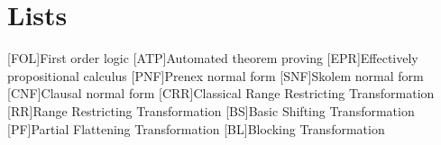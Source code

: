 \appendix
\renewcommand{\appendixtocname}{Appendix}
\renewcommand{\appendixpagename}{\appendixtocname}
\addappheadtotoc
{}
\appendixpage

\chapter{Lists}
\begin{acronym}[\hspace{3cm}]
  [FOL]{First order logic}
  [ATP]{Automated theorem proving}
  [EPR]{Effectively propositional calculus}
  [PNF]{Prenex normal form}
  [SNF]{Skolem normal form}
  [CNF]{Clausal normal form}
  [CRR]{Classical Range Restricting Transformation}
  [RR]{Range Restricting Transformation}
  [BS]{Basic Shifting Transformation}
  [PF]{Partial Flattening Transformation}
  [BL]{Blocking Transformation}
\end{acronym}
\clearpage
\listoffigures
{}
\listoftables
{}
\lstlistoflistings
{}


\begin{comment}
\chapter{Forms of first order logic formulas}
Different forms of first order logic formulas.

\chapter{Algorithms}
Different Algorithms used.
\end{comment}